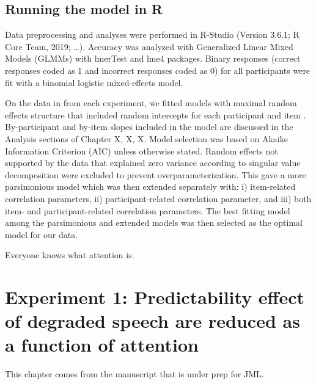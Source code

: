 \documentclass[a4paper, nobind]{templates/ociamthesis}
\begin{document}
\hypertarget{analysis-main}{%
\section{Running the model in R}\label{analysis-main}}

Data preprocessing and analyses were performed in R-Studio (Version 3.6.1; R Core Team, 2019; \ldots).
Accuracy was analyzed with Generalized Linear Mixed Models (GLMMs) with lmerTest \autocite{Kuznetsova2017} and lme4 \autocite{Bates2015} packages.
Binary responses (correct responses coded as 1 and incorrect responses coded as 0) for all participants were fit with a binomial logistic mixed-effects model.

On the data in from each experiment, we fitted models with maximal random effects structure that included random intercepts for each participant and item \autocite{Barr2013}.
By-participant and by-item slopes included in the model are discussed in the Analysis sections of Chapter X, X, X.
Model selection was based on Akaike Information Criterion (AIC) \autocite{Grueber2011,Richards2011} unless otherwise stated.
Random effects not supported by the data that explained zero variance according to singular value decomposition were excluded to prevent overparameterization.
This gave a more parsimonious model \autocite{Bates2015a} which was then extended separately with: i) item-related correlation parameters, ii) participant-related correlation parameter, and iii) both item- and participant-related correlation parameters.
The best fitting model among the parsimonious and extended models was then selected as the optimal model for our data.

\begin{savequote}
Everyone knows what attention is.
\end{savequote}



\hypertarget{experiment-1-predictability-effect-of-degraded-speech-are-reduced-as-a-function-of-attention}{%
\chapter{Experiment 1: Predictability effect of degraded speech are reduced as a function of attention}\label{experiment-1-predictability-effect-of-degraded-speech-are-reduced-as-a-function-of-attention}}

\minitoc 
\noindent This chapter comes from the manuscript that is under prep for JML.
\end{document}

